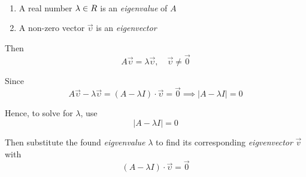 \begin{definition}\ \\
    \begin{enumerate}
        \item A real number $\lambda \in \relax{R}$ is an \textit{eigenvalue} of $A$
        \item A non-zero vector $\overrightarrow{\upsilon}$ is an \textit{eigenvector}
    \end{enumerate}
    Then
    \begin{equation}
        A \overrightarrow{\upsilon} = \lambda \overrightarrow{\upsilon}, \quad \overrightarrow{\upsilon} \ne \overrightarrow{0}
    \end{equation}
    
    Since
    \begin{equation}
        A \overrightarrow{\upsilon} - \lambda \overrightarrow{\upsilon} = (A - \lambda I) \cdot \overrightarrow{\upsilon} = \overrightarrow{0} \implies \lvert A - \lambda I \rvert = 0
    \end{equation}
    
    Hence, to solve for $\lambda$, use
    \begin{equation}
        \lvert A - \lambda I \rvert = 0
    \end{equation}
    
    Then substitute the found \textit{eigvenvalue} $\lambda$ to find its corresponding \textit{eigvenvector} $\overrightarrow{v}$ with
    \begin{equation}
        (A - \lambda I) \cdot \overrightarrow{\upsilon} = \overrightarrow{0}
    \end{equation}
\end{definition}


